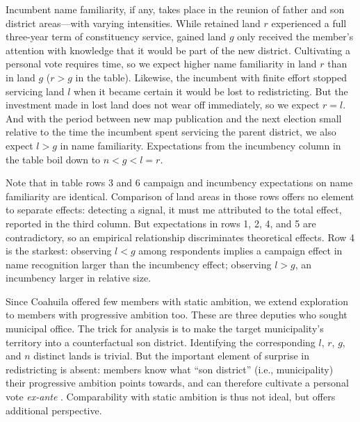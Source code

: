 \documentclass[letter,12pt]{article}
\begin{document}
Incumbent name familiarity, if any, takes place in the reunion of father and son district areas---with varying intensities. While retained land $r$ experienced a full three-year term of constituency service, gained land $g$ only received the member's attention with knowledge that it would be part of the new district. Cultivating a personal vote requires time, so we expect higher name familiarity in land $r$ than in land $g$ ($r>g$ in the table). Likewise, the incumbent with finite effort stopped servicing land $l$ when it became certain it would be lost to redistricting. But the investment made in lost land does not wear off immediately, so we expect $r=l$. And with the period between new map publication and the next election small relative to the time the incumbent spent servicing the parent district, we also expect $l>g$ in name familiarity. Expectations from the incumbency column in the table boil down to $n<g<l=r$. %

Note that in table rows 3 and 6 campaign and incumbency expectations on name familiarity are identical. Comparison of land areas in those rows offers no element to separate effects: detecting a signal, it must me attributed to the total effect, reported in the third column. But expectations in rows 1, 2, 4, and 5 are contradictory, so an empirical relationship discriminates theoretical effects. Row 4 is the starkest: observing $l<g$ among respondents implies a campaign effect in name recognition larger than the incumbency effect; observing $l>g$, an incumbency larger in relative size. 

Since Coahuila offered few members with static ambition, we extend exploration to members with progressive ambition too. These are three deputies who sought municipal office. The trick for analysis is to make the target municipality's territory into a counterfactual son district. Identifying the corresponding $l$, $r$, $g$, and $n$ distinct lands is trivial. But the important element of surprise in redistricting is absent: members know what ``son district'' (i.e., municipality) their progressive ambition points towards, and can therefore cultivate a personal vote \emph{ex-ante} \citep{lucardi.micozzi.Career-argentina.2016}. Comparability with static ambition is thus not ideal, but offers additional perspective.

\end{document}
